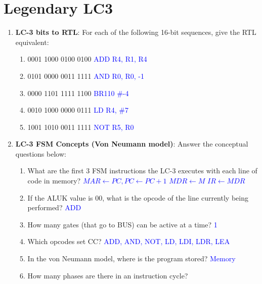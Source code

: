 \documentclass{article}
\begin{document}
\newpage
\section{Legendary LC3}
    \begin{enumerate}[label=(\alph*)]
        \item \textbf{LC-3 bits to RTL}: For each of the following 16-bit sequences, give the RTL equivalent:
        \begin{enumerate}[label=(\roman*),itemsep = 10pt]
            \item 0001 1000 0100 0100 \textcolor{blue}{ADD R4, R1, R4}
            \item 0101 0000 0011 1111 \textcolor{blue}{AND R0, R0, -1}
            \item 0000 1101 1111 1100 \textcolor{blue}{BR{110} \#-4}
            \item 0010 1000 0000 0111 \textcolor{blue}{LD R4, \#7}
            \item 1001 1010 0011 1111 \textcolor{blue}{NOT R5, R0}
        \end{enumerate}
        \item \textbf{LC-3 FSM Concepts (Von Neumann model)}: Answer the conceptual questions below:
        \begin{enumerate}[label=(\roman*),itemsep = 10pt]
            \item What are the first 3 FSM instructions the LC-3 executes with each line of code in memory?
            \newline \textcolor{blue}{$MAR \leftarrow PC, PC\leftarrow PC+1$ \newline $MDR \leftarrow M$ \newline $IR \leftarrow MDR$}
            \item If the ALUK value is 00, what is the opcode of the line currently being performed?
            \newline \textcolor{blue}{ADD}
            \item How many gates (that go to BUS) can be active at a time?
            \newline \textcolor{blue}{1}
            \item Which opcodes set CC?
            \newline \textcolor{blue}{ADD, AND, NOT, LD, LDI, LDR, LEA}
            \item In the von Neumann model, where is the program stored?
            \newline \textcolor{blue}{Memory}
            \item How many phases are there in an instruction cycle?

\end{enumerate}
\end{enumerate}
\end{document}
